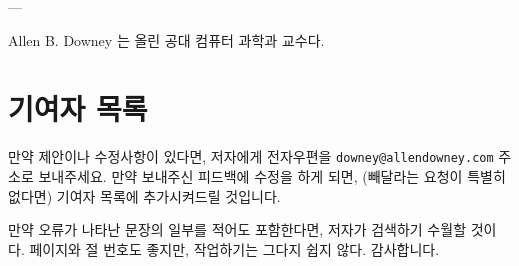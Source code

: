 ---

Allen B. Downey 는 올린 공대 컴퓨터 과학과 교수다.


\section*{기여자 목록}

만약 제안이나 수정사항이 있다면, 저자에게 전자우편을 {\tt downey@allendowney.com} 주소로 보내주세요.
만약 보내주신 피드백에 수정을 하게 되면, (빼달라는 요청이 특별히 없다면) 기여자 목록에 추가시켜드릴 것입니다.


만약 오류가 나타난 문장의 일부를 적어도 포함한다면, 저자가 검색하기 수월할 것이다. 페이지와 절 번호도 좋지만, 작업하기는 그다지 쉽지 않다. 감사합니다.

\small

